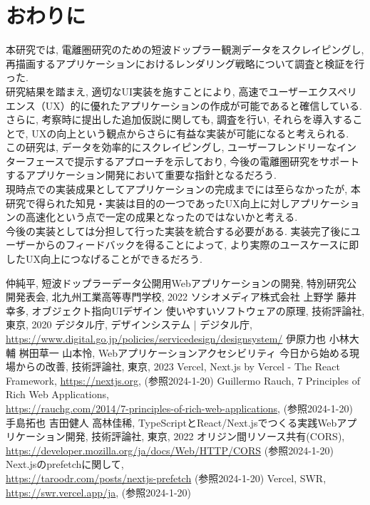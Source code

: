 \section{おわりに}
本研究では, 電離圏研究のための短波ドップラー観測データをスクレイピングし, 再描画するアプリケーションにおけるレンダリング戦略について調査と検証を行った. \\
研究結果を踏まえ, 適切なUI実装を施すことにより, 高速でユーザーエクスペリエンス（UX）的に優れたアプリケーションの作成が可能であると確信している. 
さらに, 考察時に提出した追加仮説に関しても, 調査を行い, それらを導入することで, UXの向上という観点からさらに有益な実装が可能になると考えられる. \\
この研究は, データを効率的にスクレイピングし, ユーザーフレンドリーなインターフェースで提示するアプローチを示しており, 今後の電離圏研究をサポートするアプリケーション開発において重要な指針となるだろう. \\
現時点での実装成果としてアプリケーションの完成までには至らなかったが, 本研究で得られた知見・実装は目的の一つであったUX向上に対しアプリケーションの高速化という点で一定の成果となったのではないかと考える.\\
今後の実装としては分担して行った実装を統合する必要がある. 実装完了後にユーザーからのフィードバックを得ることによって, より実際のユースケースに即したUX向上につなげることができるだろう.

\begin{thebibliography}{99}
	仲純平, 短波ドップラーデータ公開用Webアプリケーションの開発, 特別研究公開発表会, 北九州工業高等専門学校, 2022
	ソシオメディア株式会社 上野学 藤井幸多, オブジェクト指向UIデザイン 使いやすいソフトウェアの原理, 技術評論社, 東京, 2020
	デジタル庁, デザインシステム | デジタル庁, \url{https://www.digital.go.jp/policies/servicedesign/designsystem/}
	伊原力也 小林大輔 桝田草一 山本怜, Webアプリケーションアクセシビリティ 今日から始める現場からの改善, 技術評論社, 東京, 2023
	Vercel, Next.js by Vercel - The React Framework, \url{https://nextjs.org}, (参照2024-1-20)
	Guillermo Rauch, 7 Principles of Rich Web Applications, \\
	\url{https://rauchg.com/2014/7-principles-of-rich-web-applications}, (参照2024-1-20)
	手島拓也 吉田健人 高林佳稀, TypeScriptとReact/Next.jsでつくる実践Webアプリケーション開発, 技術評論社, 東京, 2022
	オリジン間リソース共有(CORS),\\ \url{https://developer.mozilla.org/ja/docs/Web/HTTP/CORS} (参照2024-1-20)
	Next.jsのprefetchに関して,\\ \url{https://taroodr.com/posts/nextjs-prefetch} (参照2024-1-20)
	Vercel, SWR, \url{https://swr.vercel.app/ja}, (参照2024-1-20)
\end{thebibliography}